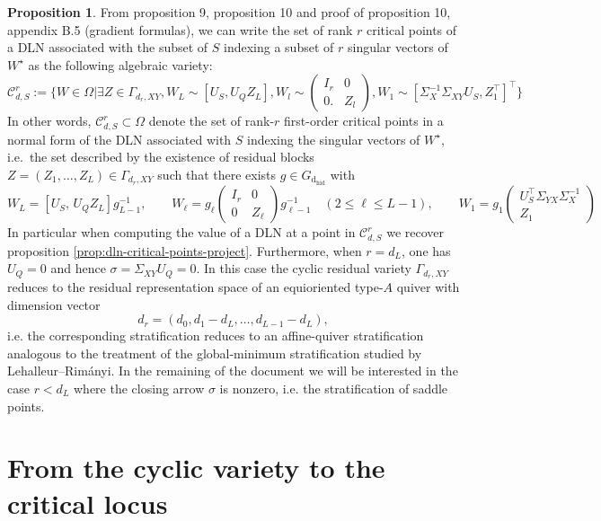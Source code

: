 \documentclass{article}
\newcommand{\dhid}{\operatorname{d_{hid}}}
\theoremstyle{definition}
\newtheorem{proposition}[theorem]{Proposition}
\begin{document}
\begin{proposition}
From \cite{achour2024loss} proposition 9, proposition 10 and proof of proposition 10, appendix B.5 (gradient formulas), we can write the set of rank $r$ critical points of a DLN associated with the subset of $S$ indexing a subset of $r$ singular vectors of $W^{\star}$ as the following algebraic variety:
\begin{equation*}
    \mathcal{C}^r_{d,S} := \{W\in \Omega| \exists Z\in\Gamma_{d_r,XY}, W_L \sim [U_S, U_QZ_L],  W_l \sim \begin{pmatrix} I_r & 0 \\
                                                      0.  & Z_l      
                                        \end{pmatrix}, W_1 \sim [\Sigma_X^{-1}\Sigma_{XY}U_S, Z_1^{\top}]^{\top}\}
\end{equation*} 
In other words, $\mathcal{C}^r_{d,S} \subset \Omega$ denote the set of rank-$r$ first-order critical points in a normal form of the DLN associated with $S$ indexing the singular vectors of $W^{\star}$, i.e.\ the set described by the existence of residual blocks $Z = (Z_1, \dots, Z_L)\in \Gamma_{d_r,XY}$ such that there exists $g \in G_{\dhid}$ with
\[
W_L = [U_S,\, U_Q Z_L]g_{L-1}^{-1}, \qquad
W_\ell = g_\ell\begin{pmatrix} I_r & 0 \\ 0 & Z_\ell \end{pmatrix}g_{\ell-1}^{-1} \quad (2\leq \ell \leq L-1), \qquad 
W_1 = g_1\begin{pmatrix} U_S^\top \Sigma_{YX}\Sigma_X^{-1} \\ Z_1 \end{pmatrix}
\]
In particular when computing the value of a DLN at a point in $\mathcal{C}^r_{d,S}$ we recover proposition \ref{prop:dln-critical-points-project}.  Furthermore, when $r=d_L$, one has $U_Q=0$ and hence $\sigma=\Sigma_{XY}U_Q=0$.
In this case the cyclic residual variety $\Gamma_{d_r,XY}$ reduces to the residual
representation space of an equioriented type-$A$ quiver with dimension vector
\[
d_r = (d_0,d_1-d_L,\dots,d_{L-1}-d_L),
\]
i.e. the corresponding stratification reduces to an affine-quiver stratification analogous to the treatment of the global-minimum
stratification studied by Lehalleur--Rim\'anyi. In the remaining of the document we will be interested in the case $r<d_L$ where the closing arrow $\sigma$ is nonzero, i.e. the stratification of saddle points.
\end{proposition}
\section{From the cyclic variety to the critical locus}
\end{document}
